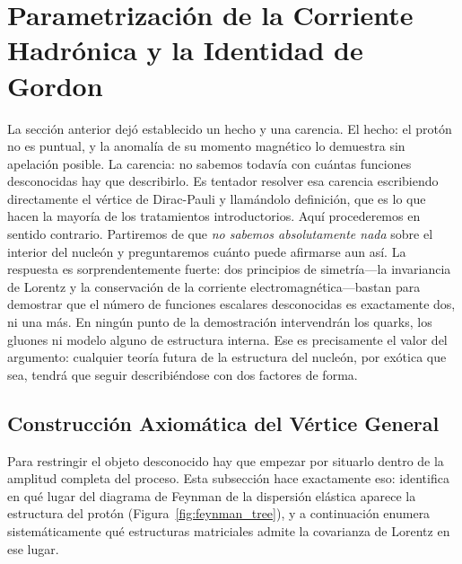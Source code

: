 \documentclass[10pt,a4paper]{article}
\begin{document}
\section{Parametrización de la Corriente Hadrónica y la Identidad de Gordon}
\label{sec:vertice_gordon}

La sección anterior dejó establecido un hecho y una carencia. El hecho: el protón no es puntual, y la anomalía de su momento magnético lo demuestra sin apelación posible. La carencia: no sabemos todavía con cuántas funciones desconocidas hay que describirlo. Es tentador resolver esa carencia escribiendo directamente el vértice de Dirac-Pauli y llamándolo definición, que es lo que hacen la mayoría de los tratamientos introductorios. Aquí procederemos en sentido contrario. Partiremos de que \emph{no sabemos absolutamente nada} sobre el interior del nucleón y preguntaremos cuánto puede afirmarse aun así. La respuesta es sorprendentemente fuerte: dos principios de simetría---la invariancia de Lorentz y la conservación de la corriente electromagnética---bastan para demostrar que el número de funciones escalares desconocidas es exactamente dos, ni una más. En ningún punto de la demostración intervendrán los quarks, los gluones ni modelo alguno de estructura interna. Ese es precisamente el valor del argumento: cualquier teoría futura de la estructura del nucleón, por exótica que sea, tendrá que seguir describiéndose con dos factores de forma.

\subsection{Construcción Axiomática del Vértice General}
Para restringir el objeto desconocido hay que empezar por situarlo dentro de la amplitud completa del proceso. Esta subsección hace exactamente eso: identifica en qué lugar del diagrama de Feynman de la dispersión elástica aparece la estructura del protón (Figura~\ref{fig:feynman_tree}), y a continuación enumera sistemáticamente qué estructuras matriciales admite la covarianza de Lorentz en ese lugar.
\end{document}
